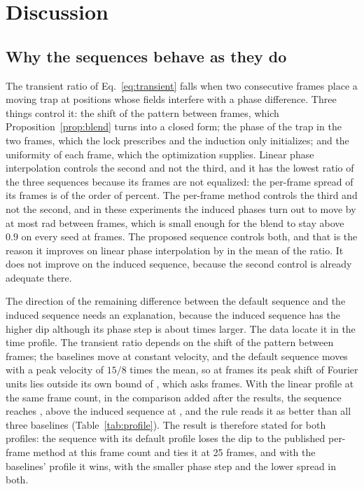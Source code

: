 \section{Discussion}\label{sec:discussion}

\subsection{Why the sequences behave as they do}

The transient ratio of Eq.~\ref{eq:transient} falls when two consecutive frames place a moving trap at positions whose fields interfere with a phase difference. Three things control it: the shift of the pattern between frames, which Proposition~\ref{prop:blend} turns into a closed form; the phase of the trap in the two frames, which the lock prescribes and the induction only initializes; and the uniformity of each frame, which the optimization supplies. Linear phase interpolation controls the second and not the third, and it has the lowest ratio of the three sequences because its frames are not equalized: the per-frame spread of its frames is of the order of \lpiSigmaFrameMed{} percent. The per-frame method controls the third and not the second, and in these experiments the induced phases turn out to move by at most \accKimFiveStepMax{} rad between frames, which is small enough for the blend to stay above $0.9$ on every seed at \parFrames{} frames. The proposed sequence controls both, and that is the reason it improves on linear phase interpolation by \diffTwoMean{} in the mean of the ratio. It does not improve on the induced sequence, because the second control is already adequate there.

The direction of the remaining difference between the default sequence and the induced sequence needs an explanation, because the induced sequence has the higher dip although its phase step is about \stepRatio{} times larger. The data locate it in the time profile. The transient ratio depends on the shift of the pattern between frames; the baselines move at constant velocity, and the default sequence moves with a peak velocity of $15/8$ times the mean, so at \parFrames{} frames its peak shift of \accPeakStep{} Fourier units lies outside its own bound of \claimStepFu{}, which asks \accFramesForMove{} frames. With the linear profile at the same frame count, in the comparison added after the results, the sequence reaches \ablTLinearMean{}, above the induced sequence at \accKimFiveTransMean{}, and the rule reads it as better than all three baselines (Table~\ref{tab:profile}). The result is therefore stated for both profiles: the sequence with its default profile loses the dip to the published per-frame method at this frame count and ties it at 25 frames, and with the baselines' profile it wins, with the smaller phase step and the lower spread in both.

